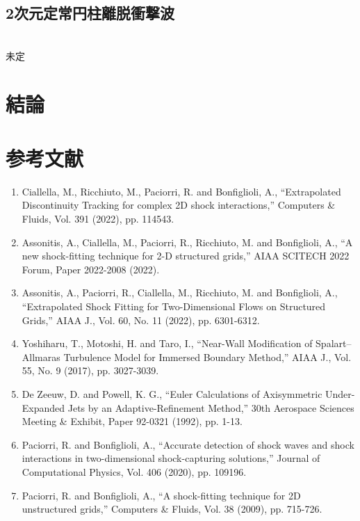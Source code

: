 \documentclass[a4j]{jarticle}
\begin{document}
\subsection{2次元定常円柱離脱衝撃波}\label{subsec:2Dcirc}
\mbox{}\\[-3.0ex]

未定

\clearpage
\section{結論}

\section*{参考文献}

\begin{enumerate}
    \item Ciallella, M., Ricchiuto, M., Paciorri, R. and Bonfiglioli, A., ``Extrapolated Discontinuity Tracking for complex 2D shock interactions,''
     Computers \& Fluids, Vol. 391 (2022), pp. 114543.
\label{ref:eDIT}
    \item Assonitis, A., Ciallella, M., Paciorri, R., Ricchiuto, M. and Bonfiglioli, A., ``A new shock-fitting technique for 2-D structured grids,''
     AIAA SCITECH 2022 Forum, Paper 2022-2008 (2022).
\label{ref:SESF}
    \item Assonitis, A., Paciorri, R., Ciallella, M., Ricchiuto, M. and Bonfiglioli, A., ``Extrapolated Shock Fitting for Two-Dimensional Flows on Structured Grids,''
     AIAA J., Vol. 60, No. 11 (2022), pp. 6301-6312.
\label{ref:SF}
    \item Yoshiharu, T., Motoshi, H. and Taro, I., ``Near-Wall Modification of Spalart–Allmaras Turbulence Model for Immersed Boundary Method,''
     AIAA J., Vol. 55, No. 9 (2017), pp. 3027-3039.
\label{ref:IBM}
    \item De Zeeuw, D. and Powell, K. G., ``Euler Calculations of Axisymmetric Under-Expanded Jets by an Adaptive-Refinement Method,''
     30th Aerospace Sciences Meeting \& Exhibit, Paper 92-0321 (1992), pp. 1-13. 
\label{ref:AMR}
    \item Paciorri, R. and Bonfiglioli, A., ``Accurate detection of shock waves and shock interactions in two-dimensional shock-capturing solutions,''
     Journal of Computational Physics, Vol. 406 (2020), pp. 109196.
\label{ref:intera}
     \item Paciorri, R. and Bonfiglioli, A., ``A shock-fitting technique for 2D unstructured grids,''
      Computers \& Fluids, Vol. 38 (2009), pp. 715-726.
\label{ref:effdomain}
    \end{enumerate}
\end{document}
